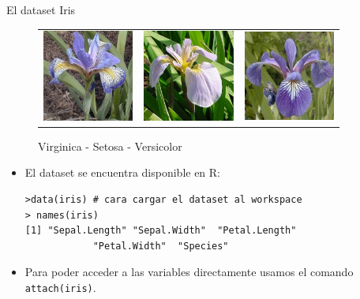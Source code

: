 \documentclass[handout]{beamer}
\begin{document}
\begin{frame}[fragile]{El dataset Iris}
\scriptsize{


 \begin{figure}[h!]
\begin{center}
\begin{tabular}{ccc}
 \includegraphics[width=3cm]{imagenes/virginica.jpg}
&
\includegraphics[width=3cm]{imagenes/setosa.jpg}
&
\includegraphics[width=3cm]{imagenes/versicolor.jpg}
\end{tabular}
\caption{Virginica - Setosa - Versicolor}
\end{center}
\end{figure}

\begin{itemize}
 \item El dataset se encuentra disponible en R:
 \begin{verbatim}
>data(iris) # cara cargar el dataset al workspace
> names(iris)
[1] "Sepal.Length" "Sepal.Width"  "Petal.Length" 
		    "Petal.Width"  "Species"     
 \end{verbatim}

 \item Para poder acceder a las variables directamente usamos el comando \verb+attach(iris)+.
 
 
\end{itemize}



}

\end{frame}
\end{document}
